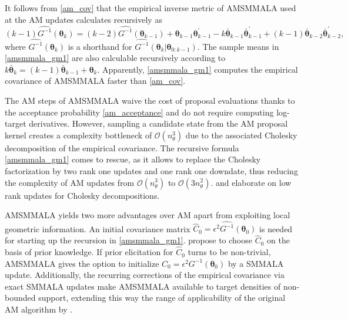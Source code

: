 \documentclass[twoside,11pt]{article}
\begin{document}
It follows from \eqref{am_cov} that the empirical inverse metric of AMSMMALA used at the AM updates calculates recursively as
\begin{equation}
\label{amsmmala_gm1}
(k-1)\widehat{G^{-1}}(\boldsymbol{\theta}_{k})=
(k-2)\widehat{G^{-1}}(\boldsymbol{\theta}_{k-1})+
\boldsymbol{\theta}_{k-1} \boldsymbol{\theta}_{k-1}^{'}-
k\bar{\boldsymbol{\theta}}_{k-1} \bar{\boldsymbol{\theta}}_{k-1}^{'}+
(k-1)\bar{\boldsymbol{\theta}}_{k-2} \bar{\boldsymbol{\theta}}_{k-2}^{'},
\end{equation}
where $\widehat{G^{-1}}(\boldsymbol{\theta}_{k})$ is a shorthand for 
$\widehat{G^{-1}}(\boldsymbol{\theta}_{k}|\boldsymbol{\theta}_{0:k-1})$.
The sample means in \eqref{amsmmala_gm1} are also calculable recursively according to
$k\bar{\boldsymbol{\theta}}_k=(k-1)\bar{\boldsymbol{\theta}}_{k-1}+\boldsymbol{\theta}_k$. Apparently, \eqref{amsmmala_gm1}
computes the empirical covariance of AMSMMALA faster than \eqref{am_cov}.

The AM steps of AMSMMALA waive the cost of proposal evaluations thanks to the acceptance probability \eqref{am_acceptance}
and do not require computing log-target derivatives. However, sampling a candidate state from the AM proposal kernel creates
a complexity bottleneck of $\mathcal{O}(n_{\theta}^3)$ due to the associated Cholesky decomposition of the empirical 
covariance. The recursive formula \eqref{amsmmala_gm1} comes to rescue, as it allows to replace the Cholesky factorization 
by two rank one updates and one rank one downdate, thus reducing the complexity of AM updates from 
$\mathcal{O}(n_{\theta}^3)$ to $\mathcal{O}(3n_{\theta}^2)$. \cite{gill_gol_wal__met} and \cite{see__low} elaborate on low 
rank updates for Cholesky decompositions.

AMSMMALA yields two more advantages over AM apart from exploiting local geometric information. An initial covariance matrix
$\hat{C}_0=\epsilon^2\widehat{G^{-1}}(\boldsymbol{\theta}_{0})$ is needed for starting up the recursion in
\eqref{amsmmala_gm1}. \cite{haa_sak_tam__ana} propose to choose $\hat{C}_0$ on the basis of prior knowledge. If prior 
elicitation for $\hat{C}_0$ turns to be non-trivial, AMSMMALA gives the option to initialize $C_0=\epsilon^2 
G^{-1}(\boldsymbol{\theta}_{0})$ by a SMMALA update. Additionally, the recurring corrections of the empirical covariance via 
exact SMMALA updates make AMSMMALA available to target densities of non-bounded support, extending this way the range of 
applicability of the original AM algorithm by \cite{haa_sak_tam__ana}. 
\end{document}
